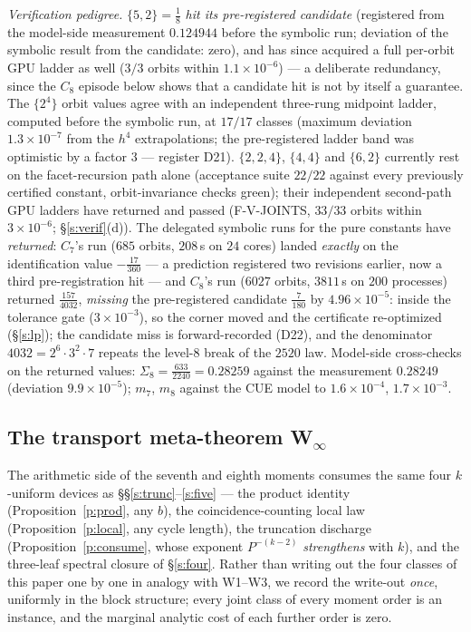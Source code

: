 \documentclass[11pt]{article}
\numberwithin{equation}{section}
\theoremstyle{definition}
\theoremstyle{remark}
\begin{document}
\emph{Verification pedigree.} $\{5,2\}=\tfrac18$ \emph{hit its
pre-registered candidate} (registered from the model-side
measurement $0.124944$ before the symbolic run; deviation of
the symbolic result from the candidate: zero), and has since
acquired a full per-orbit GPU ladder as well ($3/3$ orbits
within $1.1\times10^{-6}$) --- a deliberate redundancy, since
the $C_8$ episode below shows that a candidate hit is not by
itself a guarantee. The $\{2^4\}$
orbit values agree with an independent three-rung midpoint
ladder, computed before the symbolic run, at $17/17$ classes
(maximum deviation $1.3\times10^{-7}$ from the $h^4$
extrapolations; the pre-registered ladder band was optimistic
by a factor $3$ --- register D21). $\{2,2,4\}$, $\{4,4\}$ and
$\{6,2\}$ currently rest on the facet-recursion path alone
(acceptance suite $22/22$ against every previously certified
constant, orbit-invariance checks green); their independent
second-path GPU ladders have returned and passed
(F-V-JOINTS, $33/33$ orbits within $3\times10^{-6}$;
\S\ref{s:verif}(d)). The delegated symbolic runs for the
pure constants have \emph{returned}: $C_7$'s run ($685$
orbits, $208$\,s on $24$ cores) landed \emph{exactly} on the
identification value $-\tfrac{17}{360}$ --- a prediction
registered two revisions earlier, now a third
pre-registration hit --- and $C_8$'s run ($6027$ orbits,
$3811$\,s on $200$ processes) returned $\tfrac{157}{4032}$,
\emph{missing} the pre-registered candidate $\tfrac7{180}$ by
$4.96\times10^{-5}$: inside the tolerance gate
($3\times10^{-3}$), so the corner moved and the certificate
re-optimized (\S\ref{s:lp}); the candidate miss is
forward-recorded (D22), and the denominator
$4032=2^6\cdot3^2\cdot7$ repeats the level-$8$ break of the
$2520$ law. Model-side cross-checks on the returned values:
$\Sigma_8=\tfrac{633}{2240}=0.28259$ against the measurement
$0.28249$ (deviation $9.9\times10^{-5}$); $m_7$, $m_8$ against
the CUE model to $1.6\times10^{-4}$, $1.7\times10^{-3}$.

\subsection{The transport meta-theorem
W$_\infty$}\label{s:seven:transports}

The arithmetic side of the seventh and eighth moments consumes
the same four $k$-uniform devices as
\S\S\ref{s:trunc}--\ref{s:five} --- the product identity
(Proposition~\ref{p:prod}, any $b$), the coincidence-counting
local law (Proposition~\ref{p:local}, any cycle length), the
truncation discharge (Proposition~\ref{p:consume}, whose
exponent $P^{-(k-2)}$ \emph{strengthens} with $k$), and the
three-leaf spectral closure of \S\ref{s:four}. Rather than
writing out the four classes of this paper one by one in
analogy with W1--W3, we record the write-out \emph{once},
uniformly in the block structure; every joint class of every
moment order is an instance, and the marginal analytic cost of
each further order is zero.
\end{document}
